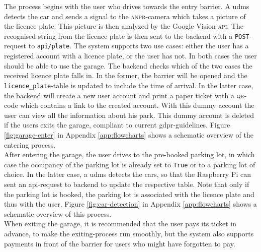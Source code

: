 The process begins with the user who drives towards the entry barrier. A \ac{udms} detects the car and sends a signal to the \textsc{anpr}-camera which takes a picture of the licence plate. This picture is then analyzed by the Google Vision \textsc{api}. The recognised string from the licence plate is then sent to the backend with a \texttt{POST}-request to \texttt{api/plate}. The system supports two use cases: either the user has a registered account with a licence plate, or the user has not. In both cases the user should be able to use the garage. The backend checks which of the two cases the received licence plate falls in. In the former, the barrier will be opened and the \verb|licence_plate|-table is updated to include the time of arrival. In the latter case, the backend will create a new user account and print a paper ticket with a \textsc{qr}-code which contains a link to the created account. With this dummy account the user can view all the information about his park. This dummy account is deleted if the users exits the garage, compliant to current \ac{gdpr}-guidelines. Figure \ref{fig:garage-enter} in Appendix \ref{app:flowcharts} shows a schematic overview of the entering process. \\

After entering the garage, the user drives to the pre-booked parking lot, in which case the occupancy of the parking lot is already set to \texttt{True} or to a parking lot of choice. In the latter case, a \ac{udms} detects the cars, so that the Raspberry Pi can sent an \ac{api}-request to backend to update the respective table. Note that only if the parking lot is booked, the parking lot is associated with the licence plate and thus with the user. Figure \ref{fig:car-detection} in Appendix \ref{app:flowcharts} shows a schematic overview of this process. \\

When exiting the garage, it is recommended that the user pays its ticket in advance, to make the exiting-process run smoothly, but the system also supports payments in front of the barrier for users who might have forgotten to pay.

